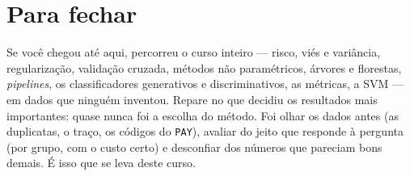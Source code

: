 \documentclass[11pt,a4paper]{article}
\newcommand{\cod}[1]{\texttt{#1}}
\begin{document}
\section*{Para fechar}
Se você chegou até aqui, percorreu o curso inteiro --- risco, viés e variância,
regularização, validação cruzada, métodos não paramétricos, árvores e florestas,
\emph{pipelines}, os classificadores generativos e discriminativos, as métricas, a SVM
--- em dados que ninguém inventou. Repare no que decidiu os resultados mais
importantes: quase nunca foi a escolha do método. Foi olhar os dados antes (as
duplicatas, o traço, os códigos do \cod{PAY}), avaliar do jeito que responde à
pergunta (por grupo, com o custo certo) e desconfiar dos números que pareciam bons
demais. É isso que se leva deste curso.
\end{document}
